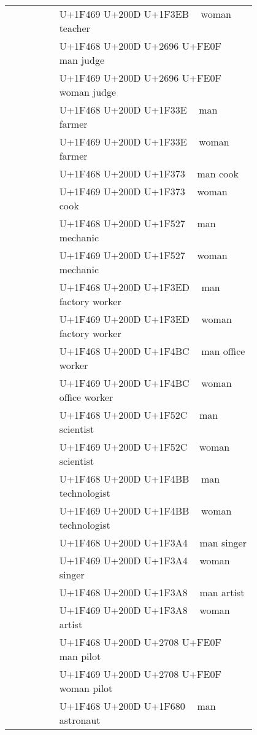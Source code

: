 \documentclass[a4paper,12pt]{ltjarticle}
\newcommand{\fontA}[1]{{\fontspec[RawFeature={mode=harf,dist,ccmp}]{Segoe UI Emoji} #1}}
\newcommand{\fontB}[1]{{\fontspec[RawFeature={mode=harf,dist,ccmp}]{Noto Color Emoji} #1}}
\begin{document}
\begin{longtable}[c]{ccp{0.8\linewidth}}
\fontA{👩‍🏫}&\fontB{👩‍🏫}&U+1F469 U+200D U+1F3EB 👩‍🏫 woman teacher\\
\fontA{👨‍⚖️}&\fontB{👨‍⚖️}&U+1F468 U+200D U+2696 U+FE0F 👨‍⚖️ man judge\\
\fontA{👩‍⚖️}&\fontB{👩‍⚖️}&U+1F469 U+200D U+2696 U+FE0F 👩‍⚖️ woman judge\\
\fontA{👨‍🌾}&\fontB{👨‍🌾}&U+1F468 U+200D U+1F33E 👨‍🌾 man farmer\\
\fontA{👩‍🌾}&\fontB{👩‍🌾}&U+1F469 U+200D U+1F33E 👩‍🌾 woman farmer\\
\fontA{👨‍🍳}&\fontB{👨‍🍳}&U+1F468 U+200D U+1F373 👨‍🍳 man cook\\
\fontA{👩‍🍳}&\fontB{👩‍🍳}&U+1F469 U+200D U+1F373 👩‍🍳 woman cook\\
\fontA{👨‍🔧}&\fontB{👨‍🔧}&U+1F468 U+200D U+1F527 👨‍🔧 man mechanic\\
\fontA{👩‍🔧}&\fontB{👩‍🔧}&U+1F469 U+200D U+1F527 👩‍🔧 woman mechanic\\
\fontA{👨‍🏭}&\fontB{👨‍🏭}&U+1F468 U+200D U+1F3ED 👨‍🏭 man factory worker\\
\fontA{👩‍🏭}&\fontB{👩‍🏭}&U+1F469 U+200D U+1F3ED 👩‍🏭 woman factory worker\\
\fontA{👨‍💼}&\fontB{👨‍💼}&U+1F468 U+200D U+1F4BC 👨‍💼 man office worker\\
\fontA{👩‍💼}&\fontB{👩‍💼}&U+1F469 U+200D U+1F4BC 👩‍💼 woman office worker\\
\fontA{👨‍🔬}&\fontB{👨‍🔬}&U+1F468 U+200D U+1F52C 👨‍🔬 man scientist\\
\fontA{👩‍🔬}&\fontB{👩‍🔬}&U+1F469 U+200D U+1F52C 👩‍🔬 woman scientist\\
\fontA{👨‍💻}&\fontB{👨‍💻}&U+1F468 U+200D U+1F4BB 👨‍💻 man technologist\\
\fontA{👩‍💻}&\fontB{👩‍💻}&U+1F469 U+200D U+1F4BB 👩‍💻 woman technologist\\
\fontA{👨‍🎤}&\fontB{👨‍🎤}&U+1F468 U+200D U+1F3A4 👨‍🎤 man singer\\
\fontA{👩‍🎤}&\fontB{👩‍🎤}&U+1F469 U+200D U+1F3A4 👩‍🎤 woman singer\\
\fontA{👨‍🎨}&\fontB{👨‍🎨}&U+1F468 U+200D U+1F3A8 👨‍🎨 man artist\\
\fontA{👩‍🎨}&\fontB{👩‍🎨}&U+1F469 U+200D U+1F3A8 👩‍🎨 woman artist\\
\fontA{👨‍✈️}&\fontB{👨‍✈️}&U+1F468 U+200D U+2708 U+FE0F 👨‍✈️ man pilot\\
\fontA{👩‍✈️}&\fontB{👩‍✈️}&U+1F469 U+200D U+2708 U+FE0F 👩‍✈️ woman pilot\\
\fontA{👨‍🚀}&\fontB{👨‍🚀}&U+1F468 U+200D U+1F680 👨‍🚀 man astronaut\\

\end{longtable}
\end{document}
